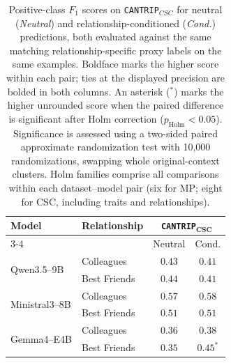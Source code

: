 \begin{table}[t]
\centering
\small
\caption{
Positive-class $F_1$ scores on \texttt{CANTRIP}$_{CSC}$ for neutral (\emph{Neutral}) and relationship-conditioned (\emph{Cond.}) predictions, both evaluated against the same matching relationship-specific proxy labels on the same examples.
Boldface marks the higher score within each pair; ties at the displayed precision are bolded in both columns.
An asterisk ($^{*}$) marks the higher unrounded score when the paired difference is significant after Holm correction ($p_{\mathrm{Holm}} < 0.05$).
Significance is assessed using a two-sided paired approximate randomization test with 10,000 randomizations, swapping whole original-context clusters. Holm families comprise all comparisons within each dataset--model pair (six for MP; eight for CSC, including traits and relationships).
}
\setlength{\tabcolsep}{4pt}
\begin{tabular}{llcc}
\toprule
\textbf{Model} & \textbf{Relationship} &
\multicolumn{2}{c}{\textbf{\texttt{CANTRIP}$_{\mathbf{CSC}}$}} \\
\cmidrule(lr){3-4}
& & Neutral & Cond. \\
\midrule

\multirow{2}{*}{Qwen3.5--9B} & Colleagues & $\mathbf{0.43}$ & $0.41$ \\
 & Best Friends & $\mathbf{0.44}$ & $0.41$ \\

\midrule

\multirow{2}{*}{Ministral3--8B} & Colleagues & $0.57$ & $\mathbf{0.58}$ \\
 & Best Friends & $\mathbf{0.51}$ & $\mathbf{0.51}$ \\

\midrule

\multirow{2}{*}{Gemma4--E4B} & Colleagues & $0.36$ & $\mathbf{0.38}$ \\
 & Best Friends & $0.35$ & $\mathbf{0.45}^{*}$ \\

\bottomrule
\end{tabular}
\label{tab:experiment2_relationships_neutral_conditioned}
\end{table}
